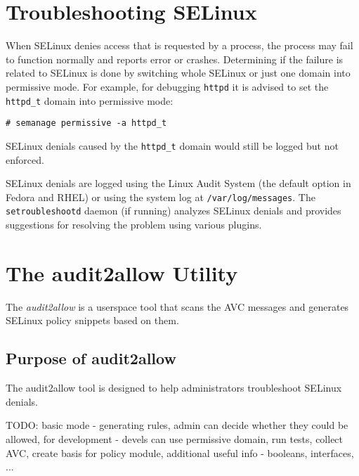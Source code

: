 \section{Troubleshooting SELinux}

When SELinux denies access that is requested by a process, the process may fail
to function normally and reports error or crashes. Determining if the failure is
related to SELinux is done by switching whole SELinux or just one domain into
permissive mode. For example, for debugging \texttt{httpd} it is advised to set
the \texttt{httpd\_t} domain into permissive mode:
\begin{lstlisting}
# semanage permissive -a httpd_t
\end{lstlisting}
SELinux denials caused by the \texttt{httpd\_t} domain would still be logged but
not enforced.

SELinux denials are logged using the Linux Audit System (the default option in
Fedora and RHEL) or using the system log at \texttt{/var/log/messages}. The
\texttt{setroubleshootd} daemon (if running) analyzes SELinux denials and
provides suggestions for resolving the problem using various plugins.

\section{The audit2allow Utility}
The \emph{audit2allow} is a userspace tool that scans the AVC messages and
generates SELinux policy snippets based on them.

\subsection{Purpose of audit2allow}

The audit2allow tool is designed to help administrators troubleshoot SELinux
denials.

TODO: basic mode - generating rules, admin can decide whether they could be
allowed, for development - devels can use permissive domain, run tests, collect
AVC, create basis for policy module, additional useful info - booleans,
interfaces, ...

